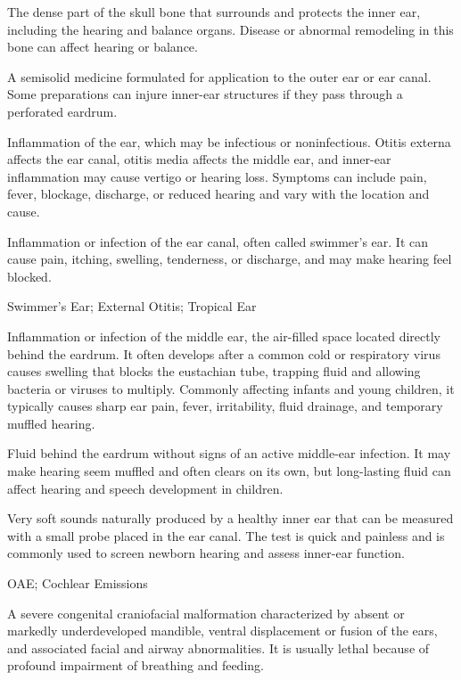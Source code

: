  The dense part of the skull bone that surrounds and protects the inner ear, including the hearing and balance organs. Disease or abnormal remodeling in this bone can affect hearing or balance.

 A semisolid medicine formulated for application to the outer ear or ear canal. Some preparations can injure inner-ear structures if they pass through a perforated eardrum.

 Inflammation of the ear, which may be infectious or noninfectious. Otitis externa affects the ear canal, otitis media affects the middle ear, and inner-ear inflammation may cause vertigo or hearing loss. Symptoms can include pain, fever, blockage, discharge, or reduced hearing and vary with the location and cause.

 Inflammation or infection of the ear canal, often called swimmer's ear. It can cause pain, itching, swelling, tenderness, or discharge, and may make hearing feel blocked.

\synonyms
Swimmer's Ear; External Otitis; Tropical Ear

 Inflammation or infection of the middle ear, the air-filled space located directly behind the eardrum. It often develops after a common cold or respiratory virus causes swelling that blocks the eustachian tube, trapping fluid and allowing bacteria or viruses to multiply. Commonly affecting infants and young children, it typically causes sharp ear pain, fever, irritability, fluid drainage, and temporary muffled hearing.

 Fluid behind the eardrum without signs of an active middle-ear infection. It may make hearing seem muffled and often clears on its own, but long-lasting fluid can affect hearing and speech development in children.

 Very soft sounds naturally produced by a healthy inner ear that can be measured with a small probe placed in the ear canal. The test is quick and painless and is commonly used to screen newborn hearing and assess inner-ear function.

\synonyms
OAE; Cochlear Emissions

 A severe congenital craniofacial malformation characterized by absent or markedly
underdeveloped mandible, ventral displacement or fusion of the ears, and associated
facial and airway abnormalities. It is usually lethal because of profound impairment of
breathing and feeding.


